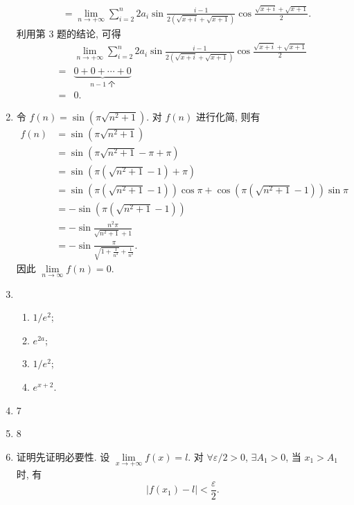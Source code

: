 \begin{enumerate}
\begin{align*}
                                                             &= \lim_{n\to+\infty}\sum_{i=2}^n 2a_i\sin\frac{i-1}{2(\sqrt{x+i} + \sqrt{x+1})}\cos\frac{\sqrt{x+i} + \sqrt{x+1}}{2}.
        \end{align*}
        利用第 3 题的结论, 可得
        \begin{align*}
                & \lim_{n\to+\infty}\sum_{i=2}^n 2a_i\sin\frac{i-1}{2(\sqrt{x+i} + \sqrt{x+1})}\cos\frac{\sqrt{x+i} + \sqrt{x+1}}{2} \\
            ={} & \underbrace{0 + 0 + \cdots + 0}_{\text{$n-1$ 个}} \\
            ={} & 0.
        \end{align*}
    \item %
        令 $f(n) = \sin(\pi\sqrt{n^2+1})$. 对 $f(n)$ 进行化简, 则有
        \begin{align*}
            f(n) &= \sin(\pi\sqrt{n^2+1}) \\
                 &= \sin(\pi\sqrt{n^2+1} - \pi + \pi) \\
                 &= \sin\left(\pi(\sqrt{n^2+1} - 1) + \pi\right) \\
                 &= \sin\left(\pi(\sqrt{n^2+1} - 1)\right)\cos\pi + \cos\left(\pi(\sqrt{n^2+1} - 1)\right)\sin\pi \\
                 &= -\sin\left(\pi(\sqrt{n^2+1} - 1)\right) \\
                 &= -\sin\frac{n^2\pi}{\sqrt{n^2+1} + 1} \\
                 &= -\sin\frac{\pi}{\sqrt{1+\frac{1}{n^2}} + \frac{1}{n^2}}.
        \end{align*}
        因此 $\lim\limits_{n\to\infty}f(n) = 0$.
    \item %
        \begin{enumerate}[(1)]
            \item %
                $1/e^2$;
            \item %
                $e^{2a}$;
            \item %
                $1/e^2$;
            \item %
                $e^{x+2}$.
        \end{enumerate}
    \item 7
    \item 8
    \item %
        {\heiti 证明}\quad 先证明必要性. 设 $\lim\limits_{x\to+\infty}f(x) = l$. 对 $\forall \varepsilon/2 > 0$, $\exists A_1 > 0$, 当 $x_1 > A_1$ 时, 有
        \[
            |f(x_1) - l| < \frac\varepsilon2.    
\]
\end{enumerate}
